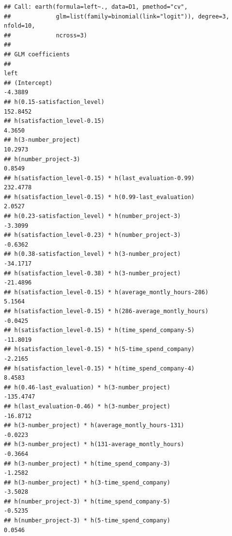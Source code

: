 \documentclass[
  11pt,
]{article}
\begin{document}
\begin{verbatim}
## Call: earth(formula=left~., data=D1, pmethod="cv",
##             glm=list(family=binomial(link="logit")), degree=3, nfold=10,
##             ncross=3)
## 
## GLM coefficients
##                                                                                           left
## (Intercept)                                                                            -4.3889
## h(0.15-satisfaction_level)                                                            152.8452
## h(satisfaction_level-0.15)                                                              4.3650
## h(3-number_project)                                                                    10.2973
## h(number_project-3)                                                                     0.8549
## h(satisfaction_level-0.15) * h(last_evaluation-0.99)                                  232.4778
## h(satisfaction_level-0.15) * h(0.99-last_evaluation)                                    2.0527
## h(0.23-satisfaction_level) * h(number_project-3)                                       -3.3099
## h(satisfaction_level-0.23) * h(number_project-3)                                       -0.6362
## h(0.38-satisfaction_level) * h(3-number_project)                                      -34.1717
## h(satisfaction_level-0.38) * h(3-number_project)                                      -21.4896
## h(satisfaction_level-0.15) * h(average_montly_hours-286)                                5.1564
## h(satisfaction_level-0.15) * h(286-average_montly_hours)                               -0.0425
## h(satisfaction_level-0.15) * h(time_spend_company-5)                                  -11.8019
## h(satisfaction_level-0.15) * h(5-time_spend_company)                                   -2.2165
## h(satisfaction_level-0.15) * h(time_spend_company-4)                                    8.4583
## h(0.46-last_evaluation) * h(3-number_project)                                        -135.4747
## h(last_evaluation-0.46) * h(3-number_project)                                         -16.8712
## h(3-number_project) * h(average_montly_hours-131)                                      -0.0223
## h(3-number_project) * h(131-average_montly_hours)                                      -0.3664
## h(3-number_project) * h(time_spend_company-3)                                          -1.2582
## h(3-number_project) * h(3-time_spend_company)                                          -3.5028
## h(number_project-3) * h(time_spend_company-5)                                          -0.5235
## h(number_project-3) * h(5-time_spend_company)                                           0.0546

\end{verbatim}
\end{document}
